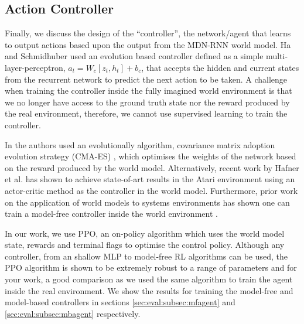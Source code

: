 \subsection{Action Controller}
\label{sec:rlopt:subsec:actionctrl}

Finally, we discuss the design of the ``controller'', the network/agent that learns to output actions based upon the output from the MDN-RNN world model. Ha and Schmidhuber \cite{ha2018worldmodels} used an evolution based controller defined as a simple multi-layer-perceptron, $a_t = W_c[z_t, h_t] + b_c$, that accepts the hidden and current states from the recurrent network to predict the next action to be taken. A challenge when training the controller inside the fully imagined world environment is that we no longer have access to the ground truth state nor the reward produced by the real environment, therefore, we cannot use supervised learning to train the controller. 

In \cite{ha2018worldmodels} the authors used an evolutionally algorithm, covariance matrix adoption evolution strategy (CMA-ES) \cite{hansen2001completely, hansen2016cma}, which optimises the weights of the network based on the reward produced by the world model. Alternatively, recent work by Hafner et al. \cite{hafner2020dream, hafner2021mastering} has shown to achieve state-of-art results in the Atari environment using an actor-critic method as the controller in the world model. Furthermore, prior work on the application of world models to systems environments has shown one can train a model-free controller inside the world environment \cite{app10196685}.


In our work, we use PPO, an on-policy algorithm which uses the world model state, rewards and terminal flags to optimise the control policy. Although any controller, from an shallow MLP to model-free RL algorithms can be used, the PPO algorithm is shown to be extremely robust to a range of parameters and for your work, a good comparison as we used the same algorithm to train the agent inside the real environment. We show the results for training the model-free and model-based controllers in sections \ref{sec:eval:subsec:mfagent} and \ref{sec:eval:subsec:mbagent} respectively.